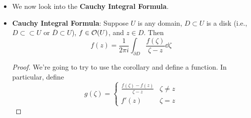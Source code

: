 \documentclass[../notes.tex]{subfiles}
\begin{document}
\begin{itemize}
\begin{proof}
\begin{figure}[H]
            \caption{Bounded holomorphic functions integrate to zero on disk boundaries.}
            \label{fig:holDiskBound}
        \end{figure}
        Via the above claim,
        \begin{equation*}
            \int_{\partial D}f\dd{z} = \int_{\gamma_\varepsilon}f\dd{z}
        \end{equation*}
        where $\gamma_\varepsilon$ is a circle around $z$ within the region where $f$ is bounded\footnote{We could also turn the plane into the sum of two star-shaped domains again.}.\par
        Step 2: We have that
        \begin{equation*}
            \left| \int_{\gamma_\varepsilon}f\dd{z} \right| \leq \max_{z\in\gamma_\varepsilon}|f(z)|\cdot\len(\gamma_\varepsilon)
        \end{equation*}
        Since $f$ is bounded near $z$, the maximum is finite. Additionally, the length term is just $2\pi\varepsilon$, so we can send $\varepsilon\to 0$ and thus send the integral to zero.
    \end{proof}
    \item We now look into the \textbf{Cauchy Integral Formula}.
    \item \textbf{Cauchy Integral Formula}: Suppose $U$ is any domain, $D\subset U$ is a disk (i.e., $D\subset\subset U$ or $\overline{D}\subset U$), $f\in\mathcal{O}(U)$, and $z\in D$. Then
    \begin{equation*}
        f(z) = \frac{1}{2\pi i}\int_{\partial D}\frac{f(\zeta)}{\zeta-z}\dd\zeta
    \end{equation*}
    \begin{proof}
        We're going to try to use the corollary and define a function. In particular, define
        \begin{equation*}
            g(\zeta) =
            \begin{cases}
                \frac{f(\zeta)-f(z)}{\zeta-z} & \zeta\neq z\\
                f'(z) & \zeta=z
            \end{cases}
        \end{equation*}

\end{proof}
\end{itemize}
\end{document}
